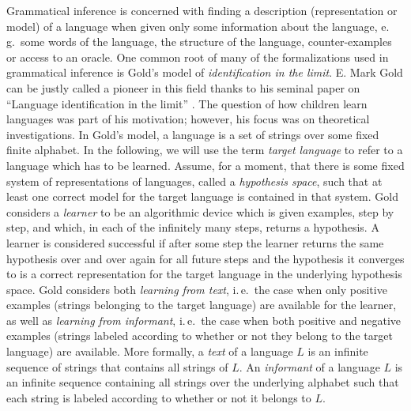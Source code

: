 Grammatical inference is concerned with finding a description (representation or model) of a language when given only some information about the language, e.\,g.\ some words of the language, the structure of the language, counter-examples or access to an oracle.
One common root of many of the formalizations used in grammatical inference is Gold's model of \emph{identification in the limit}. E. Mark Gold can be justly called a pioneer in this field thanks to his seminal paper on ``Language identification in the limit'' \citep{Gold67limit}. The question of how children learn languages was part of his motivation; however, his focus was on theoretical investigations. In Gold's model, a language is a set of strings over some fixed finite alphabet. In the following, we will use the term \emph{target language} to refer to a language which has to be learned. Assume, for a moment, that there is some fixed system of representations of languages, called a \emph{hypothesis space}, such that at least one correct model for the target language is contained in that system. Gold considers a \emph{learner} to be an algorithmic device which is given examples, step by step, and which, in each of the infinitely many steps, returns a hypothesis. A learner is considered successful if after some step the learner returns the same hypothesis over and over again for all future steps and the hypothesis it converges to is a correct representation for the target language in the underlying hypothesis space. Gold considers both \emph{learning from text}, i.\,e.\ the case when only positive examples (strings belonging to the target language) are available for the learner, as well as \emph{learning from informant}, i.\,e.\ the case when both positive and negative examples (strings labeled according to whether or not they belong to the target language) are available.  More formally, a \emph{text} of a language $L$ is an infinite sequence of strings that contains all strings of $L$. An \emph{informant} of a language $L$ is an infinite sequence containing all strings over the underlying alphabet such that each string is labeled according to whether or not it belongs to $L$.

